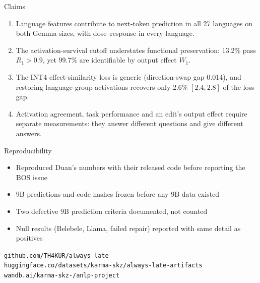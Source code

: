 \documentclass[aspectratio=169,11pt]{beamer}
\newcommand{\aside}[1]{{\small\color{muted}#1}}
\begin{document}
\begin{frame}{Claims}
\begin{enumerate}
\item Language features contribute to next-token prediction in \alert{all 27 languages} on both Gemma sizes, with dose--response in every language.
\item The activation-survival cutoff \alert{understates} functional preservation: 13.2\% pass $R_1 > 0.9$, yet 99.7\% are identifiable by output effect $W_1$.
\item The INT4 effect-similarity loss is \alert{generic} (direction-swap gap 0.014), and restoring language-group activations recovers only \alert{2.6\%} $[2.4, 2.8]$ of the loss gap.
\item Activation agreement, task performance and an edit's output effect require \alert{separate measurements}: they answer different questions and give different answers.
\end{enumerate}
\end{frame}

\begin{frame}{Reproducibility}
\begin{itemize}
\item Reproduced Duan's numbers with their released code before reporting the BOS issue
\item 9B predictions and code hashes frozen before any 9B data existed
\item Two defective 9B prediction criteria documented, not counted
\item Null results (Belebele, Llama, failed repair) reported with same detail as positives
\end{itemize}
\vspace{10pt}
\aside{\texttt{github.com/TH4KUR/always-late}\\
\texttt{huggingface.co/datasets/karma-skz/always-late-artifacts}\\
\texttt{wandb.ai/karma-skz-/anlp-project}}
\end{frame}
\end{document}
